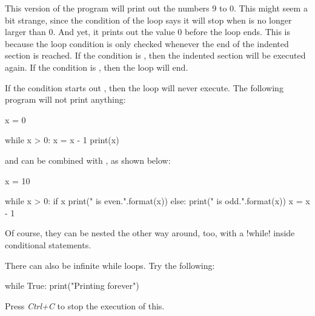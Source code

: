 \documentclass[11pt]{cselabheader}
\begin{document}
This version of the program will print out the numbers 9 to 0. This might seem a
bit strange, since the condition of the loop says it will stop when
 is no longer larger than 0. And yet, it prints out the value 0
before the loop ends. This is because the loop condition is only checked
whenever the end of the indented section is reached. If the condition is
, then the indented section will be executed again. If the
condition is , then the loop will end.

If the condition starts out , then the loop will never execute.
The following program will not print anything:

\begin{python3code}
x = 0

while x > 0:
    x = x - 1
    print(x)
\end{python3code}

 and  can be combined with , as
shown below:

\begin{python3code}
x = 10

while x > 0:
    if x %
        print("{} is even.".format(x))
    else:
        print("{} is odd.".format(x))
    x = x - 1
\end{python3code}

Of course, they can be nested the other way around, too, with a
\pythoninline!while! inside conditional statements.

There can also be infinite while loops. Try the following:
\begin{python3code}
while True:
    print("Printing forever")
\end{python3code}

Press \emph{Ctrl+C} to stop the execution of this.
\end{document}
